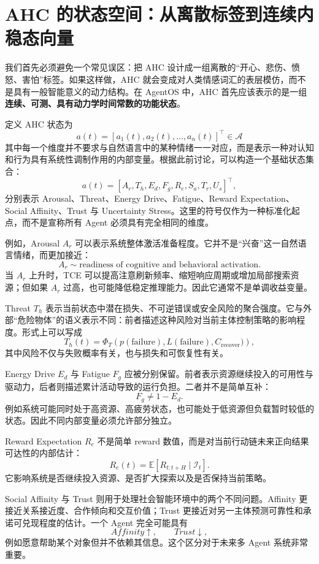 \section{AHC 的状态空间：从离散标签到连续内稳态向量}

我们首先必须避免一个常见误区：把 AHC 设计成一组离散的“开心、悲伤、愤怒、害怕”标签。如果这样做，AHC 就会变成对人类情感词汇的表层模仿，而不是具有一般智能意义的动力结构。在 AgentOS 中，AHC 首先应该表示的是一组\textbf{连续、可测、具有动力学时间常数的功能状态}。

定义 AHC 状态为
\[
\boxed{
a(t)
=
[
a_1(t),
a_2(t),
\ldots,
a_n(t)
]^\top
\in
\mathcal A
}
\]
其中每一个维度并不要求与自然语言中的某种情绪一一对应，而是表示一种对认知和行为具有系统性调制作用的内部变量。根据此前讨论，可以构造一个基础状态集合：
\[
a(t)=
[
A_r,
T_h,
E_d,
F_g,
R_e,
S_a,
T_r,
U_s
]^\top ,
\]
分别表示 Arousal、Threat、Energy Drive、Fatigue、Reward Expectation、Social Affinity、Trust 与 Uncertainty Stress。这里的符号仅作为一种标准化起点，而不是宣称所有 Agent 必须具有完全相同的维度。

例如，Arousal \(A_r\) 可以表示系统整体激活准备程度。它并不是“兴奋”这一自然语言情绪，而更加接近：
\[
A_r
\sim
\text{readiness of cognitive and behavioral activation}.
\]
当 \(A_r\) 上升时，TCE 可以提高注意刷新频率、缩短响应周期或增加局部搜索资源；但如果 \(A_r\) 过高，也可能降低稳定推理能力。因此它通常不是单调收益变量。

Threat \(T_h\) 表示当前状态中潜在损失、不可逆错误或安全风险的聚合强度。它与外部“危险物体”的语义表示不同：前者描述这种风险对当前主体控制策略的影响程度。形式上可以写成
\[
T_h(t)
=
\Phi_T
\left(
p(\mathrm{failure}),
L(\mathrm{failure}),
C_{\mathrm{recover}})
\right),
\]
其中风险不仅与失败概率有关，也与损失和可恢复性有关。

Energy Drive \(E_d\) 与 Fatigue \(F_g\) 应被分别保留。前者表示资源继续投入的可用性与驱动力，后者则描述累计活动导致的运行负担。二者并不是简单互补：
\[
F_g \neq 1-E_d.
\]
例如系统可能同时处于高资源、高疲劳状态，也可能处于低资源但负载暂时较低的状态。因此不同内部变量必须允许部分独立。

Reward Expectation \(R_e\) 不是简单 reward 数值，而是对当前行动链未来正向结果可达性的内部估计：
\[
R_e(t)
=
\mathbb E
\left[
R_{t:t+H}
\mid
\mathcal I_t
\right].
\]
它影响系统是否继续投入资源、是否扩大探索以及是否保持当前策略。

Social Affinity 与 Trust 则用于处理社会智能环境中的两个不同问题。Affinity 更接近关系接近度、合作倾向和交互价值；Trust 更接近对另一主体预测可靠性和承诺可兑现程度的估计。一个 Agent 完全可能具有
\[
Affinity\uparrow,\qquad Trust\downarrow ,
\]
例如愿意帮助某个对象但并不依赖其信息。这个区分对于未来多 Agent 系统非常重要。

